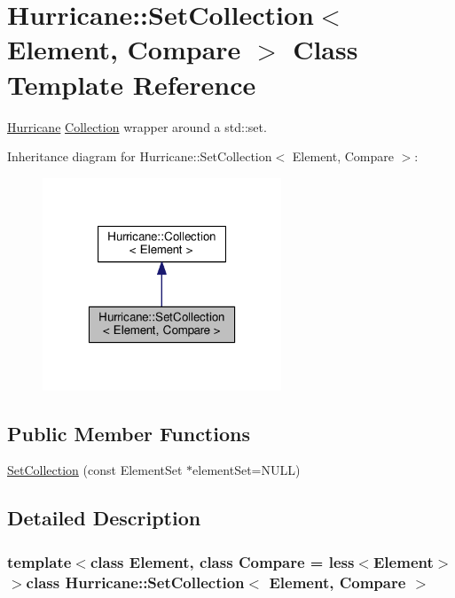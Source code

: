\hypertarget{classHurricane_1_1SetCollection}{\section{Hurricane\-:\-:Set\-Collection$<$ Element, Compare $>$ Class Template Reference}
\label{classHurricane_1_1SetCollection}
}


\hyperlink{namespaceHurricane}{Hurricane} \hyperlink{classHurricane_1_1Collection}{Collection} wrapper around a std\-::set.  




Inheritance diagram for Hurricane\-:\-:Set\-Collection$<$ Element, Compare $>$\-:\nopagebreak
\begin{figure}[H]
\begin{center}
\leavevmode
\includegraphics[width=202pt]{classHurricane_1_1SetCollection__inherit__graph}
\end{center}
\end{figure}
\subsection*{Public Member Functions}
\begin{DoxyCompactItemize}
\item 
\hyperlink{classHurricane_1_1SetCollection_a3ee200fd00f3a6951906209c11c03e34}{Set\-Collection} (const Element\-Set $\ast$element\-Set=N\-U\-L\-L)
\end{DoxyCompactItemize}


\subsection{Detailed Description}
\subsubsection*{template$<$class Element, class Compare = less$<$\-Element$>$$>$class Hurricane\-::\-Set\-Collection$<$ Element, Compare $>$}

